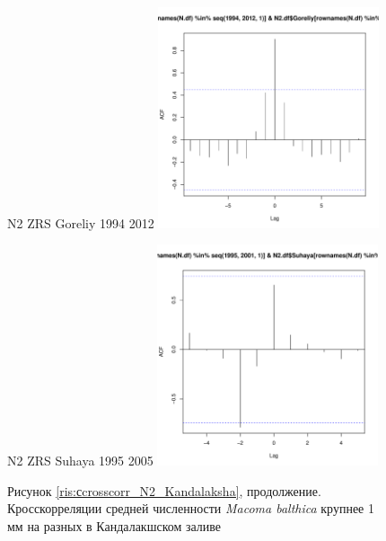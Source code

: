 \documentclass[12pt, a4paper]{disser}
\begin{document}
\begin{figure}[ht]
	\begin{minipage}[b]{.46\linewidth}
	\begin{center}
	{\tiny   N2 ZRS Goreliy 1994 2012}
	\includegraphics[width=65mm]{../White_Sea/dynamic_N_N1/crosscorr_N2_ZRS_Goreliy_1994_2012.pdf}
	\end{center}
	\end{minipage}
%
	\hfil %
%
	\begin{minipage}[b]{.46\linewidth}
	\begin{center}
	{\tiny    N2 ZRS Suhaya 1995 2005}
	\includegraphics[width=65mm]{../White_Sea/dynamic_N_N1/crosscorr_N2_ZRS_Suhaya_1995_2005.pdf}
	\end{center}
	\end{minipage}

\begin{center}
Рисунок \ref{ris:сcrosscorr_N2_Kandalaksha}, продолжение. Кросскорреляции средней численности {\it Macoma balthica} крупнее 1 мм на разных в Кандалакшском заливе
\end{center}
	\end{figure}
\end{document}
